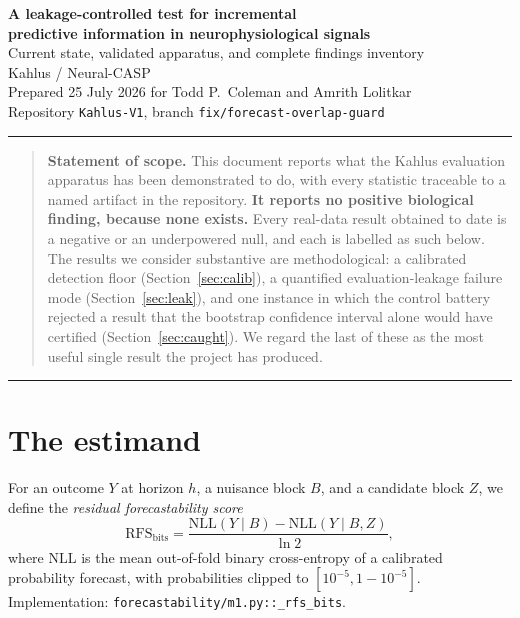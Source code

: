 \documentclass[11pt]{article}
\begin{document}
\begin{center}
{\LARGE\bfseries A leakage-controlled test for incremental\\[2pt]
predictive information in neurophysiological signals}\\[10pt]
{\large Current state, validated apparatus, and complete findings inventory}\\[16pt]

{\normalsize Kahlus / Neural-CASP}\\[6pt]
{\small Prepared 25 July 2026 for Todd P.\ Coleman and Amrith Lolitkar}\\[4pt]
{\small Repository \texttt{Kahlus-V1}, branch \texttt{fix/forecast-overlap-guard}}
\end{center}

\vspace{4pt}
\hrule
\vspace{10pt}

\begin{quote}
\small
\textbf{Statement of scope.} This document reports what the Kahlus evaluation
apparatus has been demonstrated to do, with every statistic traceable to a named
artifact in the repository. \textbf{It reports no positive biological finding,
because none exists.} Every real-data result obtained to date is a negative or an
underpowered null, and each is labelled as such below. The results we consider
substantive are methodological: a calibrated detection floor
(Section~\ref{sec:calib}), a quantified evaluation-leakage failure mode
(Section~\ref{sec:leak}), and one instance in which the control battery rejected a
result that the bootstrap confidence interval alone would have certified
(Section~\ref{sec:caught}). We regard the last of these as the most useful single
result the project has produced.
\end{quote}

\vspace{6pt}
\hrule
\vspace{12pt}

\section{The estimand}

For an outcome $Y$ at horizon $h$, a nuisance block $B$, and a candidate block
$Z$, we define the \emph{residual forecastability score}
\begin{equation}
\mathrm{RFS}_{\text{bits}}
= \frac{\mathrm{NLL}(Y \mid B) - \mathrm{NLL}(Y \mid B, Z)}{\ln 2},
\label{eq:rfs}
\end{equation}
where $\mathrm{NLL}$ is the mean out-of-fold binary cross-entropy of a calibrated
probability forecast, with probabilities clipped to $[10^{-5}, 1-10^{-5}]$.
Implementation: \texttt{forecastability/m1.py::\_rfs\_bits}.
\end{document}
